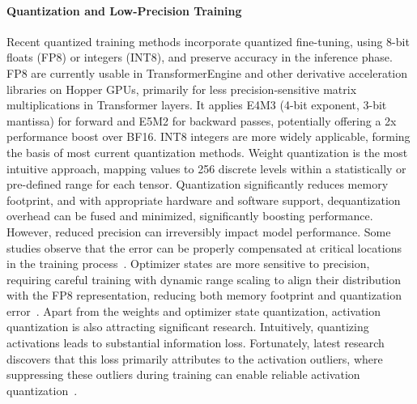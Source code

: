 \documentclass[11pt, a4paper, logo, copyright, nonumbering]{map}
\begin{document}
\paragraph{Quantization and Low-Precision Training} Recent quantized training methods incorporate quantized fine-tuning, using 8-bit floats (FP8) or integers (INT8), and preserve accuracy in the inference phase.
FP8 are currently usable in TransformerEngine and other derivative acceleration libraries \cite{deepgemm2025} on Hopper GPUs, primarily for less precision-sensitive matrix multiplications in Transformer layers.
It applies E4M3 (4-bit exponent, 3-bit mantissa) for forward and E5M2 for backward passes, potentially offering a 2x performance boost over BF16. 
INT8 integers are more widely applicable, forming the basis of most current quantization methods. 
Weight quantization is the most intuitive approach, mapping values to 256 discrete levels within a statistically or pre-defined range for each tensor. 
Quantization significantly reduces memory footprint, and with appropriate hardware and software support, dequantization overhead can be fused and minimized, significantly boosting performance.
However, reduced precision can irreversibly impact model performance.
Some studies observe that the error can be properly compensated at critical locations in the training process~\cite{peng2023fp8,yu2024collage,huang2024slim}.
Optimizer states are more sensitive to precision, requiring careful training with dynamic range scaling to align their distribution with the FP8 representation, reducing both memory footprint and quantization error~\cite{xi2024coat,dettmers2024qlora}.
Apart from the weights and optimizer state quantization, activation quantization is also attracting significant research.
Intuitively, quantizing activations leads to substantial information loss.
Fortunately, latest research discovers that this loss primarily attributes to the activation outliers, where suppressing these outliers during training can enable reliable activation quantization~\cite{li2023fptq,lin2024awq,xiao2023smoothquant}.
\end{document}
